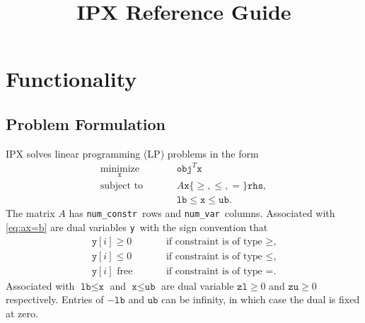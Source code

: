 \documentclass{article}
\title{IPX Reference Guide}
\newcommand{\ct}{\texttt}
\newcommand{\obj}{\ct{obj}}
\newcommand{\rhs}{\ct{rhs}}
\newcommand{\lb}{\ct{lb}}
\newcommand{\ub}{\ct{ub}}
\newcommand{\numconstr}{\ct{num\_constr}}
\newcommand{\numvar}{\ct{num\_var}}
\newcommand{\x}{\ct{x}}
\newcommand{\y}{\ct{y}}
\newcommand{\zl}{\ct{zl}}
\newcommand{\zu}{\ct{zu}}
\begin{document}
\maketitle
\tableofcontents

\section{Functionality}

\subsection{Problem Formulation}
IPX solves linear programming (LP) problems in the form
\begin{subequations}
  \label{eq:lp}
  \begin{alignat}{2}
    \underset{\x}{\text{minimize}} &\quad& &\obj^T\x \\
    \label{eq:ax=b}
    \text{subject to} && &A\x\{\ge,\le,=\}\rhs, \\
    && &\lb\le\x\le\ub.\
  \end{alignat}
\end{subequations}
The matrix $A$ has \numconstr\ rows and \numvar\ columns. Associated with
\eqref{eq:ax=b} are dual variables \y\ with the sign convention that
\begin{subequations}
  \label{eq:signy}
  \begin{alignat}{2}
    \y[i]\ge0 &\quad& &\text{if constraint is of type $\ge$,} \\
    \y[i]\le0 && &\text{if constraint is of type $\le$,} \\
    \y[i]\text{ free} && &\text{if constraint is of type $=$.}
  \end{alignat}
\end{subequations}
Associated with $\lb\le\x$ and $\x\le\ub$ are dual variable $\zl\ge0$ and
$\zu\ge0$ respectively. Entries of $-\lb$ and $\ub$ can be infinity, in which
case the dual is fixed at zero.
\end{document}
